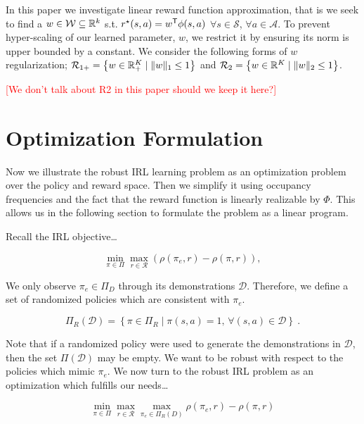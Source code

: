 \documentclass[11pt]{article}
\newcommand{\gersi}[1]{\textcolor{red}{[#1]}}
\begin{document}
In this paper we investigate linear reward function approximation, that is we seek to find a $w \in \mathcal{W} \subseteq \mathbb{R}^k$ s.t. $r^{\mathnormal{\star}}(s,a) = w^{\mathsf{T}}
	\phi(s,a)$ $\forall s \in \mathcal{S}$, $\forall a \in \mathcal{A}$. To
prevent hyper-scaling of our learned parameter, $w$, we restrict it by
ensuring its norm is upper bounded by a constant. We consider the following
forms of $w$ regularization; $\mathcal{R}_{1+} = \left\{ w \in \mathbb{R}^K_+
	\mid \| w \|_1 \le 1 \right\}$ and $\mathcal{R}_2 = \left\{ w\in \mathbb{R}^K
	\mid  \|w \|_2 \le 1 \right\}$.

\gersi{We don't talk about R2 in this paper should we keep it here?}

\section{Optimization Formulation}\label{sec:optimization-formulation}
Now we illustrate the robust IRL learning problem as an optimization problem over the policy and reward space. Then we simplify it using occupancy frequencies
and the fact that the reward function is linearly realizable by $\Phi$. This allows us in the following section to formulate the problem as a linear program.

Recall the IRL objective\dots

\begin{equation}
	\min_{\pi \in \Pi} \max_{r \in \mathcal{R}} (\rho(\pi_e, r) - \rho(\pi, r)),
\end{equation}

We only observe $\pi_e \in \Pi_D$ through its demonstrations $\mathcal{D}$. Therefore, we define a set of randomized policies which are consistent with $\pi_e$.

\begin{equation} \label{eq:consistent-policies}
	\Pi_R(\mathcal{D}) = \left\{ \pi \in \Pi_R \mid \pi(s,a) = 1, \, \forall (s,a) \in \mathcal{D} \right\}~.
\end{equation}

Note that if a randomized policy were used to generate the demonstrations in
$\mathcal{D}$, then the set $\Pi(\mathcal{D})$ may be empty. We want to be robust with respect to the policies which mimic $\pi_e$. 
We now turn to the robust IRL problem as an optimization which fulfills our needs\dots

\begin{equation}
	\label{eq:robust_IRL_formulation}
	\min_{\pi \in \Pi} \max_{r \in \mathcal{R}} \max_{\pi_e \in \Pi_{R}(D)} \rho(\pi_e, r) - \rho(\pi, r)
\end{equation}
\end{document}
